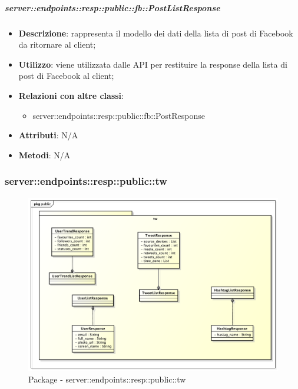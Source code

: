     \subparagraph{server::endpoints::resp::public::fb::PostListResponse} %
    \label{subp:bdsm_app_server_endpoints_resp_public_fb_postlistresponse}
    \begin{itemize}
      \item \textbf{Descrizione}: rappresenta il modello dei dati della lista di post di Facebook da ritornare al client;
      \item \textbf{Utilizzo}: viene utilizzata dalle API per restituire la response della lista di post di Facebook al client;
      \item \textbf{Relazioni con altre classi}:
        \begin{itemize}
          \item server::endpoints::resp::public::fb::PostResponse
        \end{itemize}
	  \item \textbf{Attributi}: N/A
	  \item \textbf{Metodi}: N/A
      \end{itemize}

\subsubsection{server::endpoints::resp::public::tw} %
\label{ssub:bdsm_app_server_endpoints_resp_public_tw}
\begin{figure}[!htbp]
	\centering
	\centerline{\includegraphics[scale=0.5]{./images/server/resp_tw.pdf}}
	\caption{Package - server::endpoints::resp::public::tw}
\end{figure}

